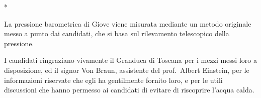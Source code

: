\documentclass[%
corpo=12pt,
twoside,
tipotesi=magistrale,
]{toptesi}\errorcontextlines=100
\begin{document}
\newtheorem{osservazione}{Osservazione}%



\begin{ThesisTitlePage}*
% 
% 
% 

%
\end{ThesisTitlePage}


\sommario%

La pressione barometrica di Giove viene misurata
mediante un metodo originale  messo a punto dai candidati, che si basa
sul rilevamento telescopico della pressione.

\ringraziamenti%

I candidati ringraziano vivamente il Granduca di Toscana per i mezzi
messi loro a disposizione, ed il signor Von Braun, assistente del
prof.~Albert Einstein, per le informazioni riservate che egli ha
gentilmente fornito loro, e per le utili discussioni che hanno permesso ai candidati di evitare di riscoprire l'acqua calda.
\end{document}
